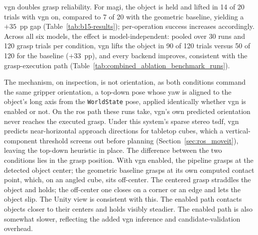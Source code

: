 \gls{vgn} doubles grasp reliability. For \gls{magi}, the object is held and lifted in 14 of 20 trials with \gls{vgn} on, compared to 7 of 20 with the geometric baseline, yielding a $+35$~pp gap (Table~\ref{tab:b15-results}); per-operation success increases accordingly. Across all six models, the effect is model-independent: pooled over 30 runs and 120 grasp trials per condition, \gls{vgn} lifts the object in 90 of 120 trials versus 50 of 120 for the baseline ($+33$~pp), and every backend improves, consistent with the grasp-execution path (Table~\ref{tab:combined_ablation_benchmark_runs}).

The mechanism, on inspection, is not orientation, as both conditions command the same gripper orientation, a top-down pose whose yaw is aligned to the object’s long axis from the \texttt{WorldState} pose, applied identically whether \gls{vgn} is enabled or not. On the \gls{ros} path these runs take, \gls{vgn}'s own predicted orientation never reaches the executed grasp. Under this system’s sparse stereo \gls{tsdf}, \gls{vgn} predicts near-horizontal approach directions for tabletop cubes, which a vertical-component threshold screens out before planning (Section~\ref{sec:ros_moveit}), leaving the top-down heuristic in place. The difference between the two conditions lies in the grasp position. With \gls{vgn} enabled, the pipeline grasps at the detected object center; the geometric baseline grasps at its own computed contact point, which, on an angled cube, sits off-center. The centered grasp straddles the object and holds; the off-center one closes on a corner or an edge and lets the object slip. The Unity view is consistent with this. The enabled path contacts objects closer to their centers and holds visibly steadier. The enabled path is also somewhat slower, reflecting the added \gls{vgn} inference and candidate-validation overhead.

